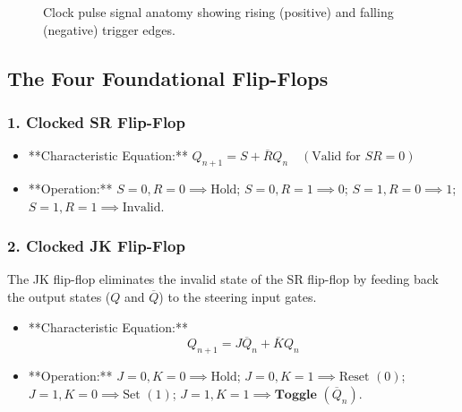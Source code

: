 \begin{figure}[htbp]
\centering
{}
\caption{Clock pulse signal anatomy showing rising (positive) and falling (negative) trigger edges.}
\label{fig:clock-edges}
\end{figure}

\subsection{The Four Foundational Flip-Flops}

\subsubsection{1. Clocked SR Flip-Flop}
\begin{itemize}
    \item **Characteristic Equation:** $Q_{n+1} = S + \overline{R}Q_n \quad (\text{Valid for } SR = 0)$
    \item **Operation:** $S=0, R=0 \implies \text{Hold}$; $S=0, R=1 \implies 0$; $S=1, R=0 \implies 1$; $S=1, R=1 \implies \text{Invalid}$.
\end{itemize}

\subsubsection{2. Clocked JK Flip-Flop}
The JK flip-flop eliminates the invalid state of the SR flip-flop by feeding back the output states ($Q$ and $\overline{Q}$) to the steering input gates.
\begin{itemize}
    \item **Characteristic Equation:**
    \begin{equation}
        Q_{n+1} = J\overline{Q}_n + \overline{K}Q_n
    \end{equation}
    \item **Operation:** $J=0, K=0 \implies \text{Hold}$; $J=0, K=1 \implies \text{Reset } (0)$; $J=1, K=0 \implies \text{Set } (1)$; $J=1, K=1 \implies \textbf{Toggle } (\overline{Q}_n)$.
\end{itemize}


